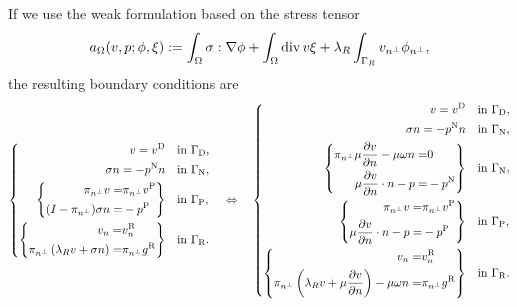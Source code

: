 \begin{proposition}\label{prop:}
If we use the weak formulation based on the stress tensor
%
\begin{equation}\label{eq:}
a_{\Omega}(v,p; \phi,\xi) := \int_{\Omega} \sigma:\nabla\phi + \int_{\Omega} \operatorname{div} v \xi
+ \lambda_R\int_{\Gamma_R}v_{{n^{\perp}}} \phi_{{n^{\perp}}},
\end{equation}
%
the resulting boundary conditions are 
%
\begin{equation}\label{eq:stokes:bccauchy}
%
\begin{aligned}
%
\left\{
\begin{aligned}
v = \vD \quad &\mbox{in $\GammaD$},\\
\sigma n= -\pN n\quad &\mbox{in $\GammaN$},\\
\left\{
\begin{aligned}
\pitang v =& \pitang \vP\\
(I-\pitang) \sigma n  =& -\pP 
\end{aligned}
\right\}
\quad  &\mbox{in $\GammaP$},\\
\left\{
\begin{aligned}
v_n =& \vRn\\
\pitang \left( \lambda_R v + \sigma n\right)  =& \pitang\gR 
\end{aligned}
\right\}
\quad &\mbox{in $\GammaR$}.
\end{aligned}
\right.
%
\quad\Leftrightarrow\quad
\left\{
\begin{aligned}
v = \vD \quad &\mbox{in $\GammaD$},\\
\sigma n= -\pN n\quad &\mbox{in $\GammaN$},\\
\left\{
\begin{aligned}
\pitang \mu \frac{\partial v}{\partial n} - \mu\omega n  =& 0\\
 \mu \frac{\partial v}{\partial n}\cdot n -p   =& -\pN
\end{aligned}
\right\}
\quad &\mbox{in $\GammaN$},\\
\left\{
\begin{aligned}
\pitang v =& \pitang \vP\\
 \mu \frac{\partial v}{\partial n}\cdot n -p   =& -\pP
\end{aligned}
\right\}
\quad &\mbox{in $\GammaP$},\\
\left\{
\begin{aligned}
v_n =& \vRn\\
\pitang \left( \lambda_R v +\mu \dn{v}\right) - \mu\omega n  =& \pitang\gR 
\end{aligned}
\right\}
\quad &\mbox{in $\GammaR$}.
\end{aligned}
\right.
%
\end{aligned}
\end{equation}
%
\end{proposition}
